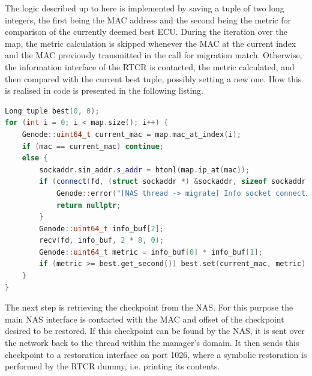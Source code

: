 The logic described up to here is implemented by saving a tuple of two long integers, the first being the MAC address and the second being the metric for comparison of the currently deemed best ECU. During the iteration over the map, the metric calculation is skipped whenever the MAC at the current index and the MAC previously transmitted in the call for migration match. Otherwise, the information interface of the RTCR is contacted, the metric calculated, and then compared with the current best tuple, possibly setting a new one. How this is realised in code is presented in the following listing.
\begin{lstlisting}[language=C++, caption={Selection of suitable ECU for migration.}] 
Long_tuple best(0, 0);
for (int i = 0; i < map.size(); i++) {
    Genode::uint64_t current_mac = map.mac_at_index(i);
    if (mac == current_mac) continue;
    else {
        sockaddr.sin_addr.s_addr = htonl(map.ip_at(mac));
        if (connect(fd, (struct sockaddr *) &sockaddr, sizeof sockaddr) < 0) {
            Genode::error("[NAS thread -> migrate] Info socket connection failed");
            return nullptr;
        }
        Genode::uint64_t info_buf[2];
        recv(fd, info_buf, 2 * 8, 0);
        Genode::uint64_t metric = info_buf[0] * info_buf[1];
        if (metric >= best.get_second()) best.set(current_mac, metric);
    }
}
\end{lstlisting}
The next step is retrieving the checkpoint from the NAS. For this purpose the main NAS interface is contacted with the MAC and offset of the checkpoint desired to be restored. If this checkpoint can be found by the NAS, it is sent over the network back to the thread within the manager's domain. It then sends this checkpoint to a restoration interface on port 1026, where a symbolic restoration is performed by the RTCR dummy, i.e. printing its contents.
